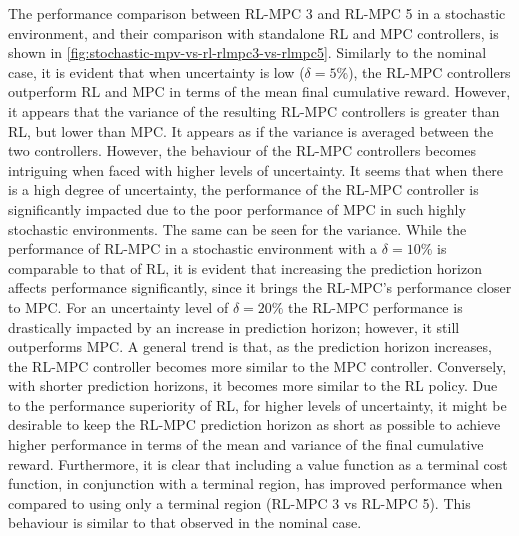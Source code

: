 The performance comparison between RL-MPC 3 and RL-MPC 5 in a stochastic environment, and their comparison with standalone RL and MPC controllers, is shown in \autoref{fig:stochastic-mpv-vs-rl-rlmpc3-vs-rlmpc5}. Similarly to the nominal case, it is evident that when uncertainty is low ($\delta = 5\%$), the RL-MPC controllers outperform RL and MPC in terms of the mean final cumulative reward. However, it appears that the variance of the resulting RL-MPC controllers is greater than RL, but lower than MPC. It appears as if the variance is averaged between the two controllers. 
However, the behaviour of the RL-MPC controllers becomes intriguing when faced with higher levels of uncertainty. It seems that when there is a high degree of uncertainty, the performance of the RL-MPC controller is significantly impacted due to the poor performance of MPC in such highly stochastic environments. The same can be seen for the variance. While the performance of RL-MPC in a stochastic environment with a $\delta = 10\%$  is comparable to that of RL, it is evident that increasing the prediction horizon affects performance significantly, since it brings the RL-MPC's performance closer to MPC. For an uncertainty level of $\delta = 20\%$ the RL-MPC performance is drastically impacted by an increase in prediction horizon; however, it still outperforms MPC. A general trend is that, as the prediction horizon increases, the RL-MPC controller becomes more similar to the MPC controller. Conversely, with shorter prediction horizons, it becomes more similar to the RL policy. Due to the performance superiority of RL, for higher levels of uncertainty, it might be desirable to keep the RL-MPC prediction horizon as short as possible to achieve higher performance in terms of the mean and variance of the final cumulative reward. Furthermore, it is clear that including a value function as a terminal cost function, in conjunction with a terminal region, has improved performance when compared to using only a terminal region (RL-MPC 3 vs RL-MPC 5). This behaviour is similar to that observed in the nominal case.

